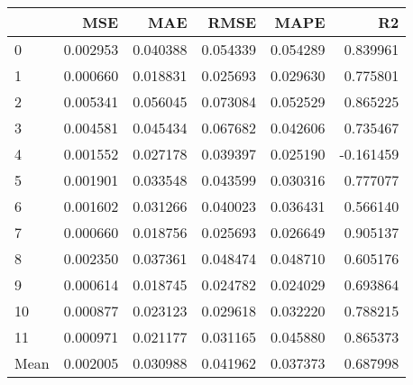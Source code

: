 \begin{tabular}{lrrrrr}
\toprule
 & MSE & MAE & RMSE & MAPE & R2 \\
\midrule
0 & 0.002953 & 0.040388 & 0.054339 & 0.054289 & 0.839961 \\
1 & 0.000660 & 0.018831 & 0.025693 & 0.029630 & 0.775801 \\
2 & 0.005341 & 0.056045 & 0.073084 & 0.052529 & 0.865225 \\
3 & 0.004581 & 0.045434 & 0.067682 & 0.042606 & 0.735467 \\
4 & 0.001552 & 0.027178 & 0.039397 & 0.025190 & -0.161459 \\
5 & 0.001901 & 0.033548 & 0.043599 & 0.030316 & 0.777077 \\
6 & 0.001602 & 0.031266 & 0.040023 & 0.036431 & 0.566140 \\
7 & 0.000660 & 0.018756 & 0.025693 & 0.026649 & 0.905137 \\
8 & 0.002350 & 0.037361 & 0.048474 & 0.048710 & 0.605176 \\
9 & 0.000614 & 0.018745 & 0.024782 & 0.024029 & 0.693864 \\
10 & 0.000877 & 0.023123 & 0.029618 & 0.032220 & 0.788215 \\
11 & 0.000971 & 0.021177 & 0.031165 & 0.045880 & 0.865373 \\
Mean & 0.002005 & 0.030988 & 0.041962 & 0.037373 & 0.687998 \\
\bottomrule
\end{tabular}
